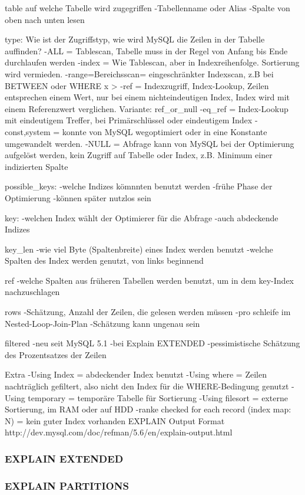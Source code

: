 table
auf welche Tabelle wird zugegriffen
-Tabellenname oder Alias
-Spalte von oben nach unten lesen

type:
Wie ist der Zugriffstyp, wie wird MySQL die Zeilen in der Tabelle auffinden?
-ALL = Tablescan, Tabelle muss in der Regel von Anfang bis Ende durchlaufen werden
-index = Wie Tablescan, aber in Indexreihenfolge. Sortierung wird vermieden.
-range=Bereichsscan= eingeschränkter Indexscan, z.B bei BETWEEN oder WHERE x >
-ref = Indexzugriff, Index-Lookup, Zeilen entsprechen einem Wert, nur bei einem nichteindeutigen Index, Index wird mit einem Referenzwert verglichen. Variante: ref_or_null
-eq_ref = Index-Lookup mit eindeutigem Treffer, bei Primärschlüssel oder eindeutigem Index
-const,system = konnte von MySQL wegoptimiert oder in eine Konstante umgewandelt werden.
-NULL = Abfrage kann von MySQL bei der Optimierung aufgelöst werden, kein Zugriff auf Tabelle oder Index, z.B. Minimum einer indizierten Spalte

possible_keys:
-welche Indizes kömnnten benutzt werden
-frühe Phase der Optimierung
-können später nutzlos sein

key:
-welchen Index wählt der Optimierer für die Abfrage
-auch abdeckende Indizes

key_len
-wie viel Byte (Spaltenbreite) eines Index werden benutzt
-welche Spalten des Index werden genutzt, von links beginnend

ref
-welche Spalten aus früheren Tabellen werden benutzt, um in dem key-Index nachzuschlagen

rows
-Schätzung, Anzahl der Zeilen, die gelesen werden müssen
-pro schleife im Nested-Loop-Join-Plan
-Schätzung kann ungenau sein

filtered
-neu seit MySQL 5.1
-bei Explain EXTENDED
-pessimistische Schätzung des Prozentsatzes der Zeilen

Extra
-Using Index = abdeckender Index benutzt
-Using where = Zeilen nachträglich gefiltert, also nicht den Index für die WHERE-Bedingung genutzt
-Using temporary = temporäre Tabelle für Sortierung
-Using filesort = externe Sortierung, im RAM oder auf HDD
-ranke checked for each record (index map: N) = kein guter Index vorhanden
EXPLAIN Output Format http://dev.mysql.com/doc/refman/5.6/en/explain-output.html

\subsubsection{EXPLAIN EXTENDED}
\subsubsection{EXPLAIN PARTITIONS}
